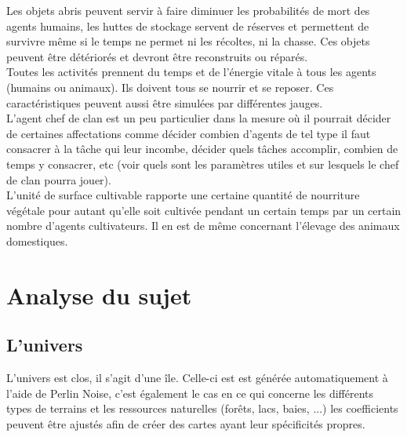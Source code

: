 \documentclass[12pt]{article}
\begin{document}
Les objets abris peuvent servir à faire diminuer les probabilités de mort des 
agents humains, les huttes de stockage servent de réserves et permettent de 
survivre même si le temps ne permet ni les récoltes, ni la chasse. Ces objets 
peuvent être détériorés et devront être reconstruits ou réparés.\\

Toutes les activités prennent du temps et de l'énergie vitale à tous les agents 
(humains ou animaux). Ils doivent tous se nourrir et se reposer. Ces 
caractéristiques peuvent aussi être simulées par différentes jauges.\\

L'agent chef de clan est un peu particulier dans la mesure où il pourrait 
décider de certaines affectations comme décider combien d'agents de tel type 
il faut consacrer à la tâche qui leur incombe, décider quels tâches accomplir, 
combien de temps y consacrer, etc (voir quels sont les paramètres utiles et 
sur lesquels le chef de clan pourra jouer).\\

L'unité de surface cultivable rapporte une certaine quantité de nourriture 
végétale pour autant qu'elle soit cultivée pendant un certain temps par un 
certain nombre d'agents cultivateurs. Il en est de même concernant l'élevage 
des animaux domestiques.\\


\section{Analyse du sujet}

	\subsection{L'univers}

L'univers est clos, il s'agit d'une île. Celle-ci est est générée 
automatiquement à l'aide de Perlin Noise, c'est également le cas en ce qui 
concerne les différents types de terrains et les ressources naturelles 
(forêts, lacs, baies, ...) les coefficients peuvent être ajustés afin de créer 
des cartes ayant leur spécificités propres.\\
\end{document}
